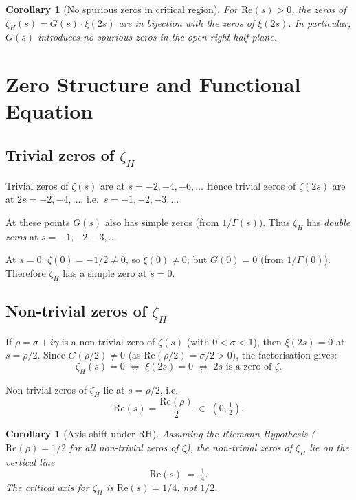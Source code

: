 \documentclass[11pt,a4paper]{article}
\newtheorem{corollary}[theorem]{Corollary}
\theoremstyle{definition}
\theoremstyle{remark}
\newcommand{\Gam}{\Gamma}
\begin{document}
\begin{corollary}[No spurious zeros in critical region]\label{cor:no-spurious}
For $\mathrm{Re}(s) > 0$, the zeros of $\zeta_H(s) = G(s)\cdot\xi(2s)$
are in bijection with the zeros of $\xi(2s)$.
In particular, $G(s)$ introduces \emph{no spurious zeros} in the
open right half-plane.
\end{corollary}

\section{Zero Structure and Functional Equation}
\label{sec:zeros}

\subsection{Trivial zeros of $\zeta_H$}

Trivial zeros of $\zeta(s)$ are at $s = -2, -4, -6, \ldots$
Hence trivial zeros of $\zeta(2s)$ are at $2s = -2, -4, \ldots$,
i.e.\ $s = -1, -2, -3, \ldots$

At these points $G(s)$ also has simple zeros (from $1/\Gam(s)$).
Thus $\zeta_H$ has \emph{double zeros} at $s = -1, -2, -3, \ldots$

At $s = 0$: $\zeta(0) = -1/2 \neq 0$, so $\xi(0) \neq 0$; but
$G(0) = 0$ (from $1/\Gam(0)$).  Therefore $\zeta_H$ has a simple zero at
$s = 0$.

\subsection{Non-trivial zeros of $\zeta_H$}

If $\rho = \sigma + i\gamma$ is a non-trivial zero of $\zeta(s)$
(with $0 < \sigma < 1$), then $\xi(2s) = 0$ at $s = \rho/2$.
Since $G(\rho/2) \neq 0$ (as $\mathrm{Re}(\rho/2) = \sigma/2 > 0$),
the factorisation gives:
\begin{equation}\label{eq:nontrivial}
  \zeta_H(s) = 0
  \;\Longleftrightarrow\;
  \xi(2s) = 0
  \;\Longleftrightarrow\;
  2s \text{ is a zero of } \zeta.
\end{equation}

Non-trivial zeros of $\zeta_H$ lie at $s = \rho/2$, i.e.\
\[
  \mathrm{Re}(s) = \frac{\mathrm{Re}(\rho)}{2} \;\in\; (0,\tfrac{1}{2}).
\]

\begin{corollary}[Axis shift under RH]\label{cor:axis}
Assuming the Riemann Hypothesis ($\mathrm{Re}(\rho) = 1/2$ for all
non-trivial zeros of $\zeta$), the non-trivial zeros of $\zeta_H$ lie on
the vertical line
\[
  \mathrm{Re}(s) \;=\; \tfrac{1}{4}.
\]
The critical axis for $\zeta_H$ is $\mathrm{Re}(s) = 1/4$,
not $1/2$.
\end{corollary}
\end{document}
